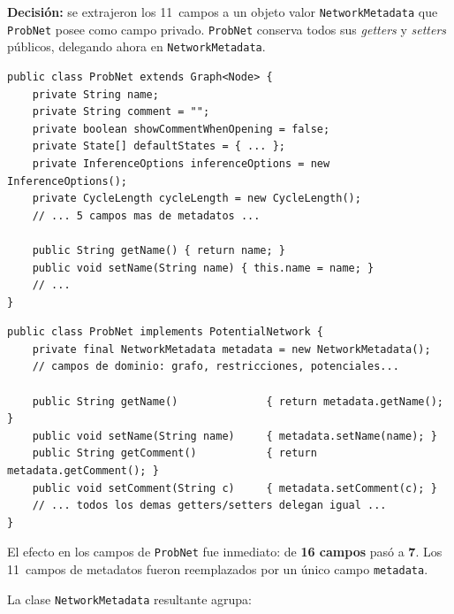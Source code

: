 \documentclass[11pt,a4paper]{article}
\newcommand{\code}[1]{\texttt{#1}}
\begin{document}
\textbf{Decisión:} se extrajeron los 11~campos a un objeto valor
\code{NetworkMetadata} que \code{ProbNet} posee como campo privado.
\code{ProbNet} conserva todos sus \emph{getters} y \emph{setters}
públicos, delegando ahora en \code{NetworkMetadata}.

\begin{lstlisting}[caption={Antes: campos de metadatos directamente en \texttt{ProbNet}.},
                   label=lst:meta-antes]
public class ProbNet extends Graph<Node> {
    private String name;
    private String comment = "";
    private boolean showCommentWhenOpening = false;
    private State[] defaultStates = { ... };
    private InferenceOptions inferenceOptions = new InferenceOptions();
    private CycleLength cycleLength = new CycleLength();
    // ... 5 campos mas de metadatos ...

    public String getName() { return name; }
    public void setName(String name) { this.name = name; }
    // ...
}
\end{lstlisting}

\begin{lstlisting}[caption={Después: metadatos delegados a \texttt{NetworkMetadata}.},
                   label=lst:meta-despues]
public class ProbNet implements PotentialNetwork {
    private final NetworkMetadata metadata = new NetworkMetadata();
    // campos de dominio: grafo, restricciones, potenciales...

    public String getName()              { return metadata.getName(); }
    public void setName(String name)     { metadata.setName(name); }
    public String getComment()           { return metadata.getComment(); }
    public void setComment(String c)     { metadata.setComment(c); }
    // ... todos los demas getters/setters delegan igual ...
}
\end{lstlisting}

El efecto en los campos de \code{ProbNet} fue inmediato: de \textbf{16
campos} pasó a \textbf{7}.  Los 11~campos de metadatos fueron
reemplazados por un único campo \code{metadata}.

La clase \code{NetworkMetadata} resultante agrupa:
\end{document}
